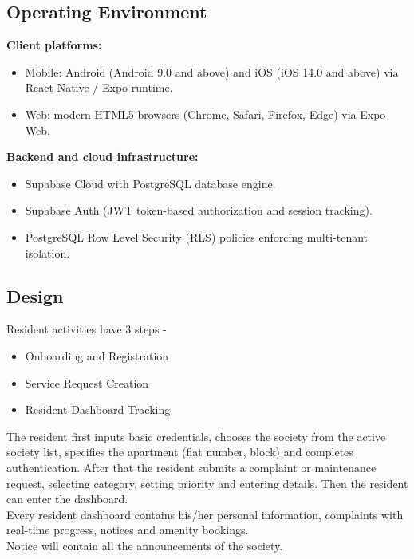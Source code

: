 \documentclass[a4paper,10pt]{scrartcl}
\numberwithin{figure}{section}
\begin{document}
\subsection{Operating Environment}
\textbf{Client platforms:}
\begin{itemize}
\item Mobile: Android (Android 9.0 and above) and iOS (iOS 14.0 and above) via React Native / Expo runtime.
\item Web: modern HTML5 browsers (Chrome, Safari, Firefox, Edge) via Expo Web.
\end{itemize}
\textbf{Backend and cloud infrastructure:}
\begin{itemize}
\item Supabase Cloud with PostgreSQL database engine.
\item Supabase Auth (JWT token-based authorization and session tracking).
\item PostgreSQL Row Level Security (RLS) policies enforcing multi-tenant isolation.
\end{itemize}

\subsection{Design}
Resident activities have 3 steps -
\begin{itemize}
\item Onboarding and Registration
\item Service Request Creation
\item Resident Dashboard Tracking
\end{itemize}

The resident first inputs basic credentials, chooses the society from the active society list, specifies the apartment (flat number, block) and completes authentication. After that the resident submits a complaint or maintenance request, selecting category, setting priority and entering details. Then the resident can enter the dashboard.\\
Every resident dashboard contains his/her personal information, complaints with real-time progress, notices and amenity bookings.\\
Notice will contain all the announcements of the society.
\end{document}

